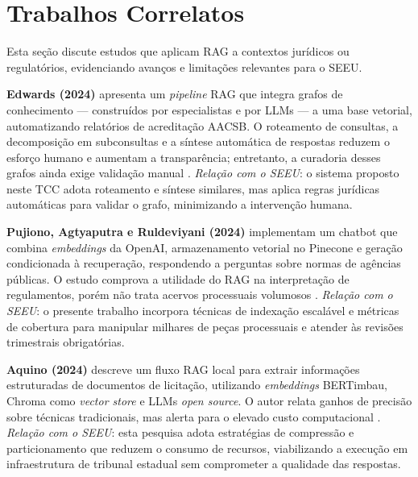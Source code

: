 
\section{Trabalhos Correlatos}
\label{sec:trabalhos-correlatos}

Esta seção discute estudos que aplicam RAG a contextos jurídicos ou regulatórios, evidenciando avanços e limitações relevantes para o SEEU.

\textbf{Edwards (2024)} apresenta um \textit{pipeline} RAG que integra grafos de conhecimento — construídos por especialistas e por LLMs — a uma base vetorial, automatizando relatórios de acreditação AACSB. O roteamento de consultas, a decomposição em subconsultas e a síntese automática de respostas reduzem o esforço humano e aumentam a transparência; entretanto, a curadoria desses grafos ainda exige validação manual \cite{edwards2024hybrid}.  
\emph{Relação com o SEEU}: o sistema proposto neste TCC adota roteamento e síntese similares, mas aplica regras jurídicas automáticas para validar o grafo, minimizando a intervenção humana.

\textbf{Pujiono, Agtyaputra e Ruldeviyani (2024)} implementam um chatbot que combina \textit{embeddings} da OpenAI, armazenamento vetorial no Pinecone e geração condicionada à recuperação, respondendo a perguntas sobre normas de agências públicas. O estudo comprova a utilidade do RAG na interpretação de regulamentos, porém não trata acervos processuais volumosos \cite{pujiono2024implementing}.  
\emph{Relação com o SEEU}: o presente trabalho incorpora técnicas de indexação escalável e métricas de cobertura para manipular milhares de peças processuais e atender às revisões trimestrais obrigatórias.

\textbf{Aquino (2024)} descreve um fluxo RAG local para extrair informações estruturadas de documentos de licitação, utilizando \textit{embeddings} BERTimbau, Chroma como \textit{vector store} e LLMs \textit{open source}. O autor relata ganhos de precisão sobre técnicas tradicionais, mas alerta para o elevado custo computacional \cite{aquino2024extracting}.  
\emph{Relação com o SEEU}: esta pesquisa adota estratégias de compressão e particionamento que reduzem o consumo de recursos, viabilizando a execução em infraestrutura de tribunal estadual sem comprometer a qualidade das respostas.


